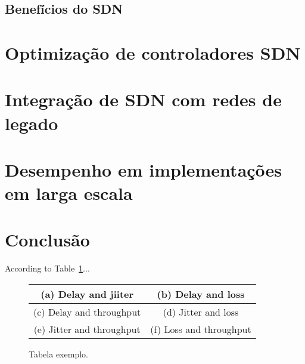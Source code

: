 \documentclass{llncs}
\begin{document}
\subsection{Benefícios do SDN}
\section{Optimização de controladores SDN}
\section{Integração de SDN com redes de legado}
\section{Desempenho em implementações em larga escala}
\section{Conclusão}


According to Table~\ref{tab:TabelaExemplo}...

\begin{figure}
\centering
\begin{tabular}{|c|c|}\hline
(a) Delay and jiiter & (b) Delay and loss \\ \hline

(c) Delay and throughput & (d) Jitter and loss \\ \hline

(e) Jitter and throughput & (f) Loss and throughput \\ \hline
\end{tabular}
\caption{\label{tab:TabelaExemplo}Tabela exemplo.}
\end{figure}

\end{document}
